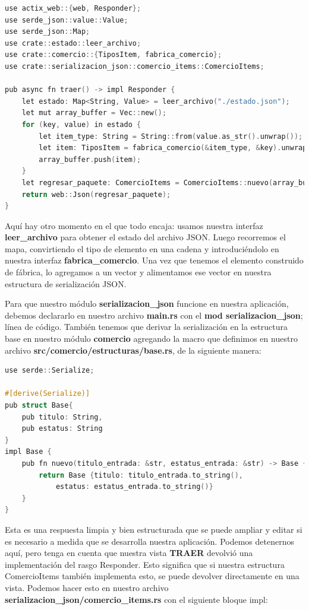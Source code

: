 \begin{lstlisting}[language=C]
use actix_web::{web, Responder};
use serde_json::value::Value;
use serde_json::Map;
use crate::estado::leer_archivo;
use crate::comercio::{TiposItem, fabrica_comercio};
use crate::serializacion_json::comercio_items::ComercioItems;

pub async fn traer() -> impl Responder {
	let estado: Map<String, Value> = leer_archivo("./estado.json");
	let mut array_buffer = Vec::new();
	for (key, value) in estado {
		let item_type: String = String::from(value.as_str().unwrap());
		let item: TiposItem = fabrica_comercio(&item_type, &key).unwrap();
		array_buffer.push(item);
	}
	let regresar_paquete: ComercioItems = ComercioItems::nuevo(array_buffer);
	return web::Json(regresar_paquete);
}
\end{lstlisting}

Aquí hay otro momento en el que todo encaja: usamos nuestra interfaz \textbf{leer\_archivo} para obtener el estado del archivo JSON. Luego recorremos el mapa, convirtiendo el tipo de elemento en una cadena y introduciéndolo en nuestra interfaz \textbf{fabrica\_comercio}. Una vez que tenemos el elemento construido de fábrica, lo agregamos a un vector y alimentamos ese vector en nuestra estructura de serialización JSON.

Para que nuestro módulo \textbf{serializacion\_json} funcione en nuestra aplicación, debemos declararlo en nuestro archivo \textbf{main.rs} con el \textbf{mod serializacion\_json}; línea de código. También tenemos que derivar la serialización en la estructura base en nuestro módulo \textbf{comercio} agregando la macro que definimos en nuestro archivo \textbf{src/comercio/estructuras/base.rs}, de la siguiente manera:

\begin{lstlisting}[language=C]
use serde::Serialize;

#[derive(Serialize)]
pub struct Base{
	pub titulo: String,
	pub estatus: String
}
impl Base {
	pub fn nuevo(titulo_entrada: &str, estatus_entrada: &str) -> Base {
		return Base {titulo: titulo_entrada.to_string(),
			estatus: estatus_entrada.to_string()}
	}
}
\end{lstlisting}

Esta es una respuesta limpia y bien estructurada que se puede ampliar y editar si es necesario a medida que se desarrolla nuestra aplicación. Podemos detenernos aquí, pero tenga en cuenta que nuestra vista \textbf{TRAER} devolvió una implementación del rasgo Responder. Esto significa que si nuestra estructura ComercioItems también implementa esto, se puede devolver directamente en una vista. Podemos hacer esto en nuestro archivo \textbf{serializacion\_json/comercio\_items.rs} con el siguiente bloque impl:


